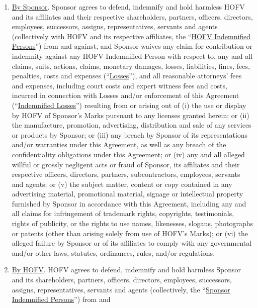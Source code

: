\documentclass{article}
\begin{document}
\begin{enumerate}
  \begin{enumerate}
  \def\labelenumii{\arabic{enumii}.}
  \item
    \uline{By Sponsor}. Sponsor agrees to defend, indemnify and hold
    harmless HOFV and its affiliates and their respective shareholders,
    partners, officers, directors, employees, successors, assigns,
    representatives, servants and agents (collectively with HOFV and its
    respective affiliates, the ``\uline{HOFV Indemnified Persons}'')
    from and against, and Sponsor waives any claim for contribution or
    indemnity against any HOFV Indemnified Person with respect to, any
    and all claims, suits, actions, claims, monetary damages, losses,
    liabilities, fines, fees, penalties, costs and expenses
    (``\uline{Losses}''), and all reasonable attorneys' fees and
    expenses, including court costs and expert witness fees and costs,
    incurred in connection with Losses and/or enforcement of this
    Agreement (``\uline{Indemnified Losses}'') resulting from or arising
    out of (i) the use or display by HOFV of Sponsor's Marks pursuant to
    any licenses granted herein; or (ii) the manufacture, promotion,
    advertising, distribution and sale of any services or products by
    Sponsor; or (iii) any breach by Sponsor of its representations
    and/or warranties under this Agreement, as well as any breach of the
    confidentiality obligations under this Agreement; or (iv) any and
    all alleged willful or grossly negligent acts or fraud of Sponsor,
    its affiliates and their respective officers, directors, partners,
    subcontractors, employees, servants and agents; or (v) the subject
    matter, content or copy contained in any advertising material,
    promotional material, signage or intellectual property furnished by
    Sponsor in accordance with this Agreement, including any and all
    claims for infringement of trademark rights, copyrights,
    testimonials, rights of publicity, or the rights to use names,
    likenesses, slogans, photographs or patents (other than arising
    solely from use of HOFV's Marks); or (vi) the alleged failure by
    Sponsor or of its affiliates to comply with any governmental and/or
    other laws, statutes, ordinances, rules, and/or regulations.
  \item
    \uline{By HOFV}. HOFV agrees to defend, indemnify and hold harmless
    Sponsor and its shareholders, partners, officers, directors,
    employees, successors, assigns, representatives, servants and agents
    (collectively, the ``\uline{Sponsor Indemnified Persons}'') from and

\end{enumerate}
\end{enumerate}
\end{document}
